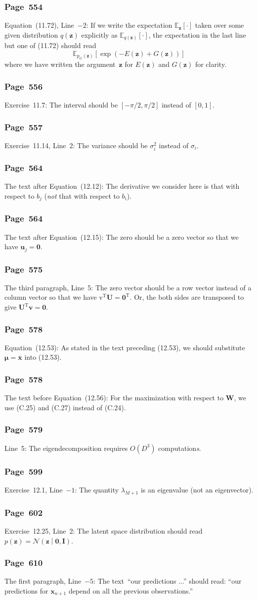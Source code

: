 \documentclass[12pt,a4paper]{article}
\newcommand{\erratum}[1]{\subsubsection*{#1}}
\begin{document}
\erratum{Page~554}
Equation~(11.72), Line~$-2$:
If we write the expectation $\mathbb{E}_{\mathbf{z}}[\cdot]$ taken over
some given distribution $q(\mathbf{z})$ explicitly as
$\mathbb{E}_{q(\mathbf{z})}\left[\cdot\right]$,
the expectation in the last line but one of (11.72) should read
\begin{equation}
\mathbb{E}_{p_{G}(\mathbf{z})} \left[ \exp\left(-E(\mathbf{z}) + G(\mathbf{z}) \right) \right]
\end{equation}
where we have written the argument~$\mathbf{z}$ for $E(\mathbf{z})$ and $G(\mathbf{z})$
for clarity.

\erratum{Page~556}
Exercise~11.7:
The interval should be $\left[ -\pi/2 , \pi/2 \right]$ instead of $[0, 1]$.

\erratum{Page~557}
Exercise~11.14, Line~2:
The variance should be $\sigma_i^2$ instead of $\sigma_i$.

\erratum{Page~564}
The text after Equation~(12.12):
The derivative we consider here is that with respect to $b_j$
(\emph{not} that with respect to $b_i$).

\erratum{Page~564}
The text after Equation~(12.15):
The zero should be a zero vector so that we have $\mathbf{u}_j = \mathbf{0}$.

\erratum{Page~575}
The third paragraph, Line~5:
The zero vector should be a row vector instead of a column vector so that we have
$\mathrm{v}^{\operatorname{T}}\mathbf{U} = \mathbf{0}^{\operatorname{T}}$.
Or, the both sides are transposed to give $\mathbf{U}^{\operatorname{T}}\mathbf{v} = \mathbf{0}$.

\erratum{Page~578}
Equation~(12.53):
As stated in the text preceding (12.53),
we should substitute $\bm{\mu} = \bar{\mathbf{x}}$ into (12.53).

\erratum{Page~578}
The text before Equation~(12.56):
For the maximization with respect to $\mathbf{W}$, we use (C.25) and (C.27) instead of (C.24).

\erratum{Page~579}
Line~5:
The eigendecomposition requires $O(D^3)$ computation\emph{s}.

\erratum{Page~599}
Exercise~12.1, Line~$-1$:
The quantity $\lambda_{M + 1}$ is an eigenvalue (not an eigenvector).

\erratum{Page~602}
Exercise~12.25, Line~2:
The latent space distribution should read
$p(\mathbf{z}) = \mathcal{N}\left( \mathbf{z} \middle| \mathbf{0}, \mathbf{I}\right)$.

\erratum{Page~610}
The first paragraph, Line~$-5$:
The text~``our predictions ...'' should read: ``our predictions for $\mathbf{x}_{n + 1}$
depend on all the previous observations.''
\end{document}
